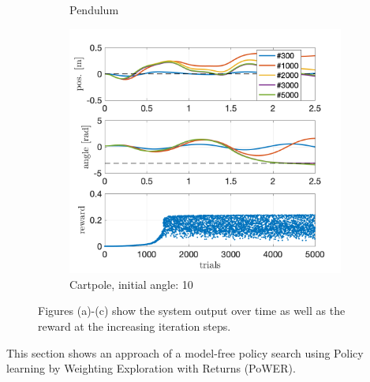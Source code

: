 \documentclass[letterpaper, 10 pt, conference]{ieeeconf}  %
\begin{document}
\begin{figure}[!thp]
\begin{subfigure}{0.325\textwidth}
	\caption{Pendulum \newline}\label{fig:PoWER_pendulum}
	\end{subfigure}
	\begin{subfigure}{0.325\textwidth}
	\includegraphics[width=\textwidth]{julia_cp10_quad.png}
	\caption{Cartpole, initial angle: 10\textdegree}\label{fig:PoWER_cp}
	\end{subfigure}\caption{Figures (a)-(c) show the system output over time as well as the reward at the increasing iteration steps.}\label{fig:PoWER}
\end{figure} 
This section shows an approach of a model-free policy search using Policy learning by Weighting Exploration with Returns (PoWER).
\end{document}
